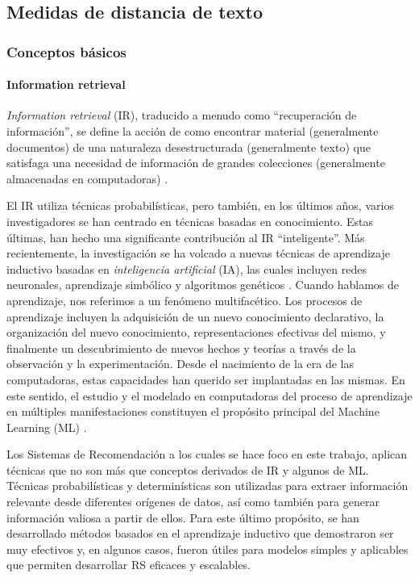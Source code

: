 \subsection{Medidas de distancia de texto}
\subsubsection{Conceptos básicos}
\paragraph{Information retrieval}
\textit{Information retrieval} (IR), traducido a menudo como ``recuperación de información'', se define la acción de como encontrar material (generalmente documentos) de una naturaleza desestructurada (generalmente texto) que satisfaga una necesidad de información de grandes colecciones (generalmente almacenadas en computadoras) \citep{schutze2008introduction}.

\bigskip El IR utiliza técnicas probabilísticas, pero también, en los últimos años, varios investigadores se han centrado en técnicas basadas en conocimiento. Estas últimas, han hecho una significante contribución al IR “inteligente”. Más recientemente, la investigación se ha volcado a nuevas técnicas de aprendizaje inductivo basadas en \textit{inteligencia artificial} (IA), las cuales incluyen redes neuronales, aprendizaje simbólico y algoritmos genéticos \citep{chen1995machine}. Cuando hablamos de aprendizaje, nos referimos a un fenómeno multifacético. Los procesos de aprendizaje incluyen la adquisición de un nuevo conocimiento declarativo, la organización del nuevo conocimiento, representaciones efectivas del mismo, y finalmente un descubrimiento de nuevos hechos y teorías a través de la observación y la experimentación. Desde el nacimiento de la era de las computadoras, estas capacidades han querido ser implantadas en las mismas. En este sentido, el estudio y el modelado en computadoras del proceso de aprendizaje en múltiples manifestaciones constituyen el propósito principal del Machine Learning (ML) \citep{mitchell2013artificial}.

\bigskip Los Sistemas de Recomendación a los cuales se hace foco en este trabajo, aplican técnicas que no son más que conceptos derivados de IR y algunos de ML. Técnicas probabilísticas y determinísticas son utilizadas para extraer información relevante desde diferentes orígenes de datos, así como también para generar información valiosa a partir de ellos. Para este último propósito, se han desarrollado métodos basados en el aprendizaje inductivo que demostraron ser muy efectivos y, en algunos casos, fueron útiles para modelos simples y aplicables que permiten desarrollar RS eficaces y escalables.

